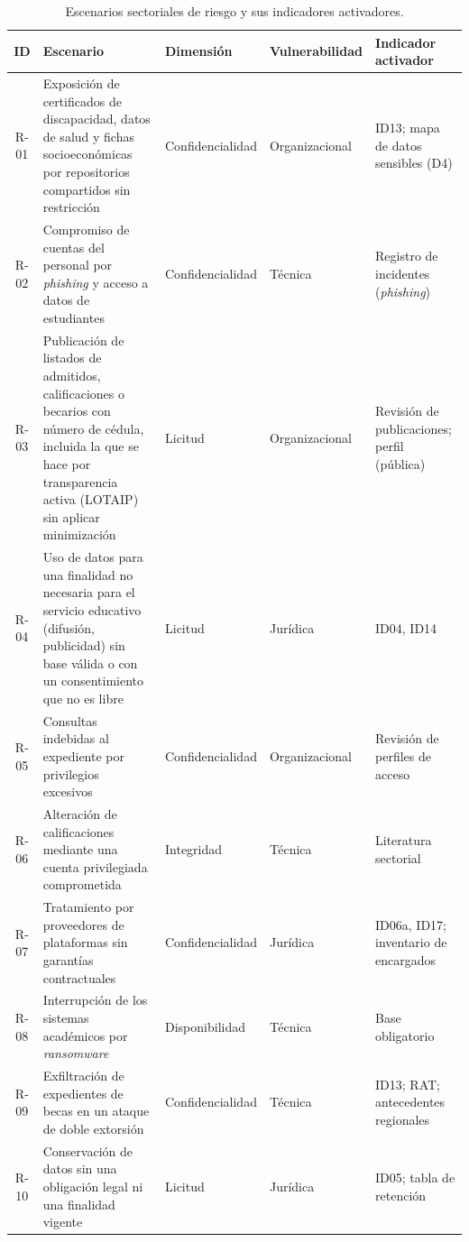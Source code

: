 \begin{table}[htbp]
  \centering
  \caption{Escenarios sectoriales de riesgo y sus indicadores activadores.}
  \label{tab:escenarios}
  \scriptsize
  \renewcommand{\arraystretch}{1.12}
  \begin{tabularx}{\textwidth}{|c|L|>{\raggedright\arraybackslash}p{2.05cm}|>{\raggedright\arraybackslash}p{1.8cm}|>{\raggedright\arraybackslash}p{2.1cm}|}
    \hline
    \textbf{ID} & \textbf{Escenario} & \textbf{Dimensión} & \textbf{Vulnerabilidad} & \textbf{Indicador activador} \\
    \hline
    R-01 & Exposición de certificados de discapacidad, datos de salud y fichas socioeconómicas por repositorios compartidos sin restricción & Confidencialidad & Organizacional & ID13; mapa de datos sensibles (D4) \\ \hline
    R-02 & Compromiso de cuentas del personal por \textit{phishing} y acceso a datos de estudiantes & Confidencialidad & Técnica & Registro de incidentes (\textit{phishing}) \\ \hline
    R-03 & Publicación de listados de admitidos, calificaciones o becarios con número de cédula, incluida la que se hace por transparencia activa (LOTAIP) sin aplicar minimización & Licitud & Organizacional & Revisión de publicaciones; perfil (pública) \\ \hline
    R-04 & Uso de datos para una finalidad no necesaria para el servicio educativo (difusión, publicidad) sin base válida o con un consentimiento que no es libre & Licitud & Jurídica & ID04, ID14 \\ \hline
    R-05 & Consultas indebidas al expediente por privilegios excesivos & Confidencialidad & Organizacional & Revisión de perfiles de acceso \\ \hline
    R-06 & Alteración de calificaciones mediante una cuenta privilegiada comprometida & Integridad & Técnica & Literatura sectorial \\ \hline
    R-07 & Tratamiento por proveedores de plataformas sin garantías contractuales & Confidencialidad & Jurídica & ID06a, ID17; inventario de encargados \\ \hline
    R-08 & Interrupción de los sistemas académicos por \textit{ransomware} & Disponibilidad & Técnica & Base obligatorio \\ \hline
    R-09 & Exfiltración de expedientes de becas en un ataque de doble extorsión & Confidencialidad & Técnica & ID13; RAT; antecedentes regionales \\ \hline
    R-10 & Conservación de datos sin una obligación legal ni una finalidad vigente & Licitud & Jurídica & ID05; tabla de retención \\ \hline

\end{tabularx}
\end{table}
